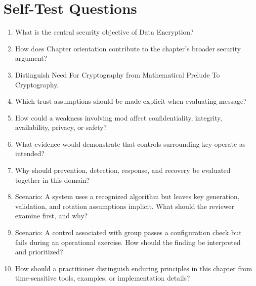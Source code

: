 \documentclass[11pt]{article}
\begin{document}
\section*{Self-Test Questions}
\begin{enumerate}
\item What is the central security objective of Data Encryption?
\item How does Chapter orientation contribute to the chapter's broader security argument?
\item Distinguish Need For Cryptography from Mathematical Prelude To Cryptography.
\item Which trust assumptions should be made explicit when evaluating message?
\item How could a weakness involving mod affect confidentiality, integrity, availability, privacy, or safety?
\item What evidence would demonstrate that controls surrounding key operate as intended?
\item Why should prevention, detection, response, and recovery be evaluated together in this domain?
\item Scenario: A system uses a recognized algorithm but leaves key generation, validation, and rotation assumptions implicit. What should the reviewer examine first, and why?
\item Scenario: A control associated with group passes a configuration check but fails during an operational exercise. How should the finding be interpreted and prioritized?
\item How should a practitioner distinguish enduring principles in this chapter from time-sensitive tools, examples, or implementation details?
\end{enumerate}
\end{document}
